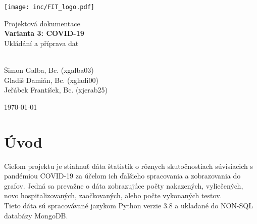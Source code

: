 \documentclass[a4paper, 11pt]{article}
\begin{document}

\begin{titlepage}

\begin{center}
			\texttt{[image: inc/FIT\_logo.pdf]} \\

			

			\Huge{Projektová dokumentace} \\
			\vspace{0.5cm}
			\LARGE{\textbf{
				Varianta 3: COVID-19
			}} \\
			\vspace{0.5cm}
			\Large{Ukládání a příprava dat}

		\end{center}

		{\Large
			
			\hfill \\
			Šimon Galba, Bc. (xgalba03) \\
			Gladiš Damián, Bc. (xgladi00) 	\\
			Jeřábek František, Bc. (xjerab25)\\

		}
					\vspace{1cm}
					{\Large
			\today}

\end{titlepage}	


	\setcounter{page}{1}
	\setlength{\parskip}{0pt}
{\hypersetup{hidelinks}\tableofcontents}
\setlength{\parskip}{0pt}
	\clearpage



	\setcounter{page}{1}

	\section{Úvod}

    Cieľom projektu je stiahnuť dáta štatistík o rôznych skutočnostiach súvisiacich s pandémiou COVID-19 za účelom ich ďalšieho spracovania a zobrazovania do grafov. Jedná sa prevažne o dáta zobrazujúce počty nakazených, vyliečených, novo hospitalizovaných, zaočkovaných, alebo počte vykonaných testov. \\ Tieto dáta sú spracovávané jazykom Python verzie 3.8 a ukladané do NON-SQL databázy MongoDB.  
\end{document}
